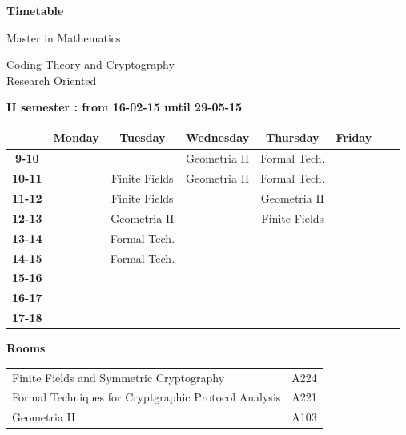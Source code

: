 \documentclass{article}
\begin{document}
\begin{landscape}

\begin{center}
\begin{huge}
	\textbf{Timetable}\\
\end{huge}
\bigskip
\begin{Large}
Master in Mathematics \\
\end{Large}
\begin{large}
Coding Theory and Cryptography\\
Research Oriented
\end{large}
\bigskip
\end{center}


\begin{center}
\textbf{II semester : from 16-02-15 until 29-05-15}
\end{center}

\begin{table}[ht]
\centering
\begin{tabular}{|c|c|c|c|c|c|c|c|}\hline
& \textbf{Monday} & \textbf{Tuesday} & \textbf{Wednesday} & \textbf{Thursday} & \textbf{Friday}\\ \hline
\textbf{9-10} & & & Geometria II & Formal Tech. & \\ \hline
\textbf{10-11} & & Finite Fields & Geometria II & Formal Tech. & \\ \hline
\textbf{11-12} & & Finite Fields & & Geometria II & \\ \hline
\textbf{12-13} & & Geometria II & & Finite Fields & \\ \hline
\textbf{13-14} & & Formal Tech.& & & \\ \hline
\textbf{14-15} & & Formal Tech. & & & \\ \hline
\textbf{15-16} & & & & & \\ \hline
\textbf{16-17} & & & & & \\ \hline
\textbf{17-18} & & & & & \\ \hline
\end{tabular}
\end{table}

\textbf{Rooms}\\
\begin{table}[ht]
\begin{tabular}{ll}
	Finite Fields and Symmetric Cryptography & A224\\
	Formal Techniques for Cryptgraphic Protocol Analysis & A221\\
	Geometria II & A103\\
\end{tabular}
\end{table}

\end{landscape}
\end{document}
